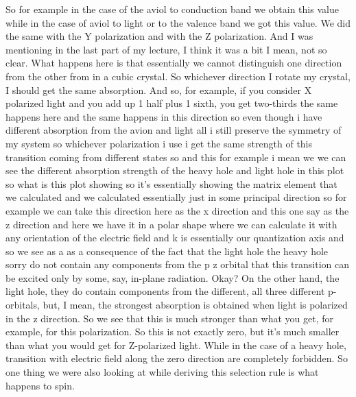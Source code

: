 So for example in the case of the aviol to conduction band we obtain this value while in the case of aviol to light or to the valence band we got this value. We did the same with the Y polarization and with the Z polarization. And I was mentioning in the last part of my lecture, I think it was a bit I mean, not so clear. What happens here is that essentially we cannot distinguish one direction from the other from in a cubic crystal. So whichever direction I rotate my crystal, I should get the same absorption. And so, for example, if you consider X polarized light and you add up 1 half plus 1 sixth, you get two-thirds the same happens here and the same happens in this direction so even though i have different absorption from the avion and light all i still preserve the symmetry of my system so whichever polarization i use i get the same strength of this transition coming from different states so and this for example i mean we we can see the different absorption strength of the heavy hole and light hole in this plot so what is this plot showing so it's essentially showing the matrix element that we calculated and we calculated essentially just in some principal direction so for example we can take this direction here as the x direction and this one say as the z direction and here we have it in a polar shape where we can calculate it with any orientation of the electric field and k is essentially our quantization axis and so we see as a as a consequence of the fact that the light hole the heavy hole sorry do not contain any components from the p z orbital that this transition can be excited only by some, say, in-plane radiation. Okay? On the other hand, the light hole, they do contain components from the different, all three different p-orbitals, but, I mean, the strongest absorption is obtained when light is polarized in the z direction. So we see that this is much stronger than what you get, for example, for this polarization. So this is not exactly zero, but it's much smaller than what you would get for Z-polarized light. While in the case of a heavy hole, transition with electric field along the zero direction are completely forbidden. So one thing we were also looking at while deriving this selection rule is what happens to spin.
